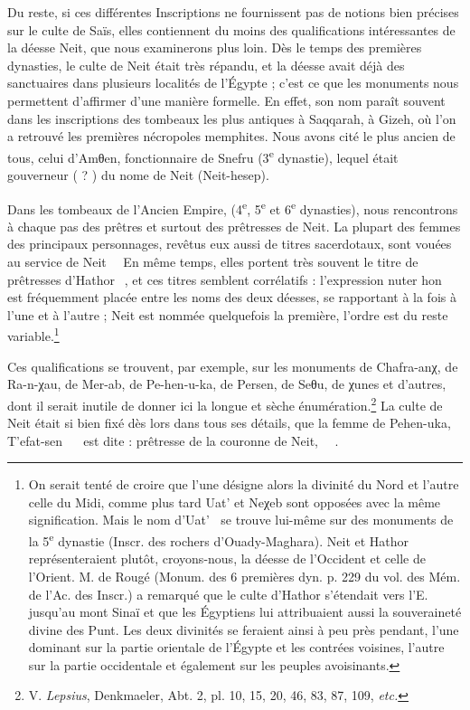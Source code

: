 \documentclass[letterpaper,twocolumn,openany,nodeprecatedcode]{dndbook}
\newcommand*\hieroAAAG{}
\newcommand*\hieroAAAO{}
\newcommand*\hieroAAAQ{}
\newcommand*\hieroAAAY{}
\newcommand*\hieroAABF{}
\newcommand*\hieroAACB{\raisebox{0.5ex}{}}
\newcommand*\hieroAACN{\raisebox{1ex}{}}
\newcommand*\hieroAACS{}
\newcommand*\hieroAAEK{}
\newcommand*\hieroAAHC{}
\newcommand*\hieroAAQY{}
\newcommand*\hieroAARM{}
\newcommand*\hieroAARN{}
\newcommand*\hieroAARP{}
\newcommand*\hieroAARQ{\raisebox{0.5ex}{}}
\begin{document}
Du reste, si ces différentes Inscriptions ne fournissent pas de notions bien précises sur le culte de Saïs, elles contiennent du moins des qualifications intéressantes de la déesse Neit, que nous examinerons plus loin.
 Dès le temps des premières dynasties, le culte de Neit était très répandu, et la déesse avait déjà des sanctuaires dans plusieurs localités de l'Égypte ; c'est ce que les monuments nous permettent d'affirmer d'une manière formelle. En effet, son nom paraît souvent dans les inscriptions des tombeaux les plus antiques à Saqqarah, à Gizeh, où l'on a retrouvé les premières nécropoles memphites. Nous avons cité le plus ancien de tous, celui d'Amθen, fonctionnaire de Snefru (3\textsuperscript{e} dynastie), lequel était gouverneur ( ? ) du nome de Neit (Neit-hesep).

Dans les tombeaux de l'Ancien Empire, (4\textsuperscript{e}, 5\textsuperscript{e} et 6\textsuperscript{e} dynasties), nous rencontrons à chaque pas des prêtres et surtout des prêtresses de Neit. La plupart des femmes des principaux personnages, revêtus eux aussi de titres sacerdotaux, sont vouées au service de Neit $\hieroAAAQ\:\hieroAABF\allowbreak\:\hieroAAEK\:\hieroAAHC$ En même temps, elles portent très souvent le titre de prêtresses d'Hathor $\hieroAARM\:\hieroAAEK\:\hieroAAHC$, et ces titres semblent corrélatifs : l'expression nuter hon $\hieroAAEK\:\hieroAAHC$ est fréquemment placée entre les noms des deux déesses, se rapportant à la fois à l'une et à l'autre ; Neit est nommée quelquefois la première, l'ordre est du reste variable.\footnote{On serait tenté de croire que l'une désigne alors la divinité du Nord et l'autre celle du Midi, comme plus tard Uat' et Neχeb sont opposées avec la même signification. Mais le nom d'Uat' $\hieroAAAY\:\hieroAARN$ se trouve lui-même sur des monuments de la 5\textsuperscript{e} dynastie (Inscr. des rochers d'Ouady-Maghara). Neit et Hathor représenteraient plutôt, croyons-nous, la déesse de l'Occident et celle de l'Orient. M. de Rougé (Monum. des 6 premières dyn. p. 229 du vol. des Mém. de l'Ac. des Inscr.) a remarqué que le culte d'Hathor s'étendait vers l'E. jusqu'au mont Sinaï et que les Égyptiens lui attribuaient aussi la souveraineté divine des Punt. Les deux divinités se feraient ainsi à peu près pendant, l'une dominant sur la partie orientale de l'Égypte et les contrées voisines, l'autre sur la partie occidentale et également sur les peuples avoisinants.}

Ces qualifications se trouvent, par exemple, sur les monuments de Chafra-anχ, de Ra-n-χau, de Mer-ab, de Pe-hen-u-ka, de Persen, de Seθu, de χunes et d'autres, dont il serait inutile de donner ici la longue et sèche énumération.\footnote{V. \emph{Lepsius}, Denkmaeler, Abt. 2, pl. 10, 15, 20, 46, 83, 87, 109, \emph{etc.}} La culte de Neit était si bien fixé dès lors dans tous ses détails, que la femme de Pehen-uka, T'efat-sen $\hieroAAQY\:\hieroAAAG\:\hieroAACB\allowbreak\:\hieroAACS\:\hieroAACN$ est dite : prêtresse de la couronne de Neit, $\hieroAAAO\:\hieroAARP\:\hieroAARQ\allowbreak\:\hieroAAEK\:\hieroAAHC$.
\end{document}
